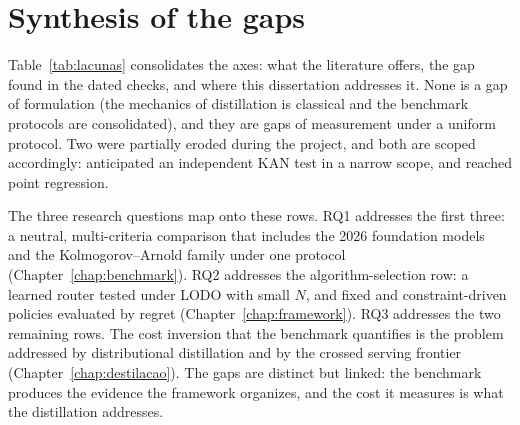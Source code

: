 \section{Synthesis of the gaps}
\label{sec:rel-sintese}

Table~\ref{tab:lacunas} consolidates the axes: what the literature
offers, the gap found in the dated checks, and where this
dissertation addresses it. None is a gap of formulation (the mechanics of distillation is classical and the benchmark protocols are consolidated), and they are gaps of measurement under a
uniform protocol. Two were partially eroded during the
project, and both are scoped accordingly: \citet{poeta2024}
anticipated an independent KAN test in a narrow scope, and
\citet{jeong2026} reached point regression.


The three research questions map onto these rows. RQ1 addresses the first three: a neutral, multi-criteria comparison that includes
the 2026 foundation models and the Kolmogorov--Arnold family under
one protocol (Chapter~\ref{chap:benchmark}). RQ2 addresses the
algorithm-selection row: a learned router tested under LODO with
small $N$, and fixed and constraint-driven policies evaluated by
regret (Chapter~\ref{chap:framework}). RQ3 addresses the two
remaining rows. The cost inversion that the benchmark quantifies is the problem addressed by distributional distillation and by the crossed serving frontier (Chapter~\ref{chap:destilacao}). The gaps are
distinct but linked: the benchmark produces the evidence the framework organizes, and the cost it measures is what the distillation addresses.

